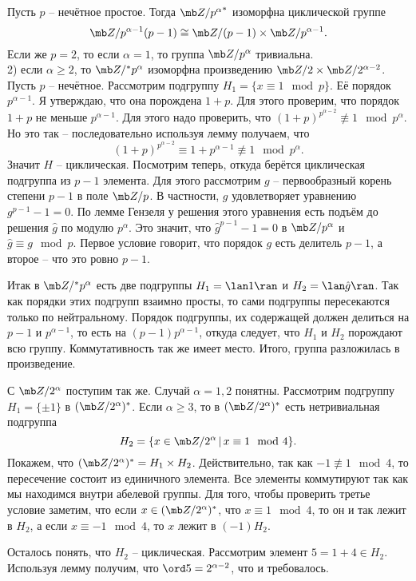 \utv Пусть  $p$ -- нечётное простое. Тогда ${\mb Z/p^{\alpha}}^*$ изоморфна циклической группе 
$$\mb Z/p^{\alpha-1} (p-1) \cong \mb Z/(p - 1) \times \mb Z/p^{\alpha-1}.$$
Если же $p=2$, то если $\alpha = 1$, то группа $\mb Z/p^{\alpha}$ тривиальна.\\
2) если $\alpha \geq 2$, то $\mb Z/^*p^{\alpha}$ изоморфна произведению $ \mb Z/2 \times \mb Z/2^{\alpha-2}$.
\eutv
\proof
Пусть $p$ -- нечётное. Рассмотрим подгруппу $H_1=\{ x\equiv 1 \mod p\}$. Её порядок $p^{\alpha -1}$. Я утверждаю, что она порождена $1+p$. Для этого проверим, что порядок $1+p$ не меньше $p^{\alpha-1}$. Для этого надо проверить, что $(1+p)^{p^{\alpha-2}} \not\equiv 1 \mod p^{\alpha}$. Но это так -- последовательно используя лемму получаем, что
$$(1+p)^{p^{\alpha-2}}\equiv 1+p^{\alpha-1}\not\equiv 1 \mod p^{\alpha}.$$
Значит $H$ -- циклическая. Посмотрим теперь, откуда берётся циклическая подгруппа из $p-1$ элемента. Для этого рассмотрим $g$ -- первообразный корень степени $p-1$ в поле $\mb Z/p$. В частности, $g$ удовлетворяет уравнению $g^{p-1}-1=0$. По лемме Гензеля у решения этого уравнения есть подъём до решения $\hat{g}$ по модулю $p^{\alpha}$. Это значит, что $\hat{g}^{p-1}-1=0$ в $\mb Z/p^{\alpha}$ и $\hat{g}\equiv g \mod p$. Первое условие говорит, что порядок $g$ есть делитель $p-1$, а второе -- что это ровно $p-1$.

Итак в $\mb Z/^*p^{\alpha}$ есть две подгруппы $H_1=\lan 1\ran$ и $H_2=\lan \hat{g} \ran$. Так как порядки этих подгрупп взаимно просты, то сами подгруппы пересекаются только по нейтральному. Порядок подгруппы, их содержащей  должен делиться на $p-1$ и $p^{\alpha-1}$, то есть на $(p-1)p^{\alpha-1}$, откуда следует, что $H_1$ и $H_2$ порождают всю группу. Коммутативность так же имеет место. Итого, группа разложилась в произведение.

С $\mb Z/2^{\alpha}$ поступим так же. Случай $\alpha=1,2$ понятны. Рассмотрим подгруппу $H_1=\{\pm 1\}$ в $(\mb Z/2^\alpha)^*$. Если $\alpha\geq 3$, то в $(\mb Z/2^\alpha)^*$ есть нетривиальная подгруппа 
$$H_2=\{ x\in \mb Z/2^\alpha\,|\, x \equiv 1 \mod 4\}.$$
Покажем, что $(\mb Z/2^\alpha)^* =H_1 \times H_2$. Действительно, так как $-1\not\equiv 1 \mod 4$, то пересечение состоит из единичного элемента. Все элементы коммутируют так как мы находимся внутри абелевой группы. Для того, чтобы проверить третье условие заметим, что если $x\in (\mb Z/2^\alpha)^*$, что $x\equiv 1\mod 4$, то он и так лежит в $H_2$, а если $x\equiv -1 \mod 4$, то $x$ лежит в $(-1)H_2$.

Осталось понять, что $H_2$ -- циклическая. Рассмотрим элемент $5=1+4\in H_2$. Используя лемму получим, что $\ord 5 = 2^{\alpha-2}$, что и требовалось. 


